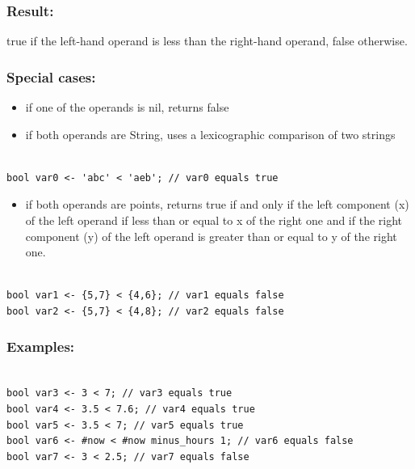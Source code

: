 \documentclass[]{book}
\providecommand{\tightlist}{%
  \setlength{\itemsep}{0pt}\setlength{\parskip}{0pt}}
\theoremstyle{definition}
\theoremstyle{definition}
\theoremstyle{definition}
\theoremstyle{remark}
\begin{document}
\subsubsection{Result:}\label{result-10}

true if the left-hand operand is less than the right-hand operand, false
otherwise.

\subsubsection{Special cases:}\label{special-cases-8}

\begin{itemize}
\tightlist
\item
  if one of the operands is nil, returns false\\
\item
  if both operands are String, uses a lexicographic comparison of two
  strings
\end{itemize}

\begin{verbatim}
 
bool var0 <- 'abc' < 'aeb'; // var0 equals true
\end{verbatim}

\begin{itemize}
\tightlist
\item
  if both operands are points, returns true if and only if the left
  component (x) of the left operand if less than or equal to x of the
  right one and if the right component (y) of the left operand is
  greater than or equal to y of the right one.
\end{itemize}

\begin{verbatim}
 
bool var1 <- {5,7} < {4,6}; // var1 equals false 
bool var2 <- {5,7} < {4,8}; // var2 equals false
\end{verbatim}

\subsubsection{Examples:}\label{examples-7}

\begin{verbatim}
 
bool var3 <- 3 < 7; // var3 equals true 
bool var4 <- 3.5 < 7.6; // var4 equals true 
bool var5 <- 3.5 < 7; // var5 equals true 
bool var6 <- #now < #now minus_hours 1; // var6 equals false 
bool var7 <- 3 < 2.5; // var7 equals false
\end{verbatim}
\end{document}
